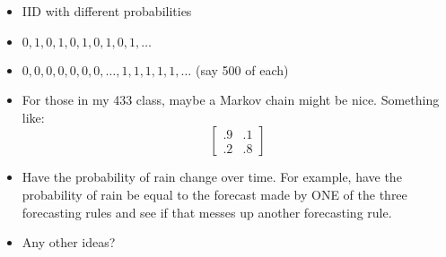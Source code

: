 \documentclass[12pt]{extarticle}
\begin{document}
\begin{enumerate}
\begin{enumerate}
\begin{itemize}
\item IID with different probabilities
\item $0,1,0,1,0,1,0,1,0,1,\ldots$
\item $0,0,0,0,0,0,0,\ldots,1,1,1,1,1,\ldots$ (say 500 of each)
\item For those in my 433 class, maybe a Markov chain might be
nice. Something like:
\begin{displaymath}
\left[\begin{array}{cc}.9 &.1\\.2 & .8
\end{array}
\right]
\end{displaymath}
\item Have the probability of rain change over time.  For example,
have the probability of rain be equal to the forecast made by ONE of
the three forecasting rules and see if that messes up another
forecasting rule.
\item Any other ideas?
\end{itemize}
\end{enumerate}


\end{enumerate}
\end{document}

